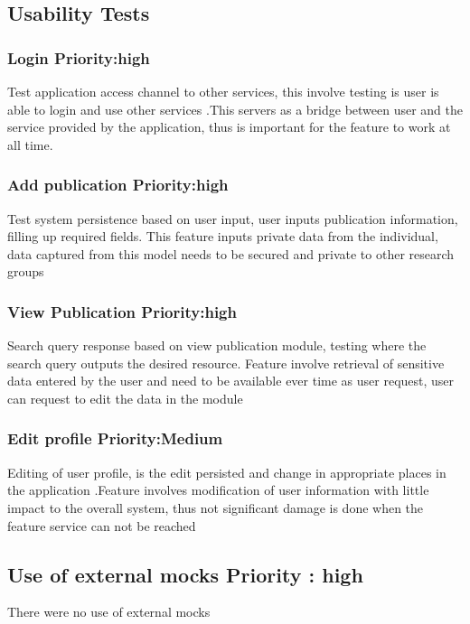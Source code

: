 
\subsection{Usability Tests}

\subsubsection{Login Priority:high}
Test application access channel to other services, this involve testing is user is able to login and use other services
.This servers as a bridge between user and the service provided by the application, thus is important for the feature to work at all time. 


\subsubsection{Add publication Priority:high}
Test system persistence based on user input, user inputs publication information, filling up required fields.
This feature inputs private data from the individual, data captured from this model needs to be secured and private to other research groups  


\subsubsection{View Publication Priority:high}
Search query response based on view publication module, testing where the search query outputs the desired resource.
Feature involve retrieval of sensitive data entered by the user and need to be available ever time as user request, user can request to edit the data in the module


\subsubsection{Edit profile Priority:Medium}
Editing of user profile, is the edit persisted and change in appropriate places in the application 
.Feature involves modification of user information with little impact to the overall system, thus not significant damage is done when the feature service can not be reached 





\subsection{Use of external mocks Priority : high }
There were no use of external mocks

